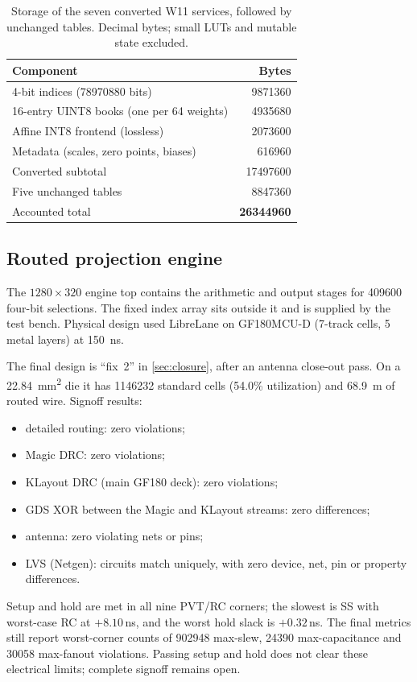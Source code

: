 \begin{table}[t]
\centering\small
\caption{Storage of the seven converted W11 services, followed by unchanged tables. Decimal bytes; small LUTs and mutable state excluded.}
\label{tab:storage}
\begin{tabular}{@{}lr@{}}
\toprule
Component & Bytes\\
\midrule
4-bit indices (\num{78970880} bits) & \num{9871360}\\
16-entry UINT8 books (one per 64 weights) & \num{4935680}\\
Affine INT8 frontend (lossless) & \num{2073600}\\
Metadata (scales, zero points, biases) & \num{616960}\\
\midrule
Converted subtotal & \num{17497600}\\
Five unchanged tables & \num{8847360}\\
\midrule
Accounted total & \textbf{\num{26344960}}\\
\bottomrule
\end{tabular}
\end{table}

\subsection{Routed projection engine}
The $1280\times320$ engine top contains the arithmetic and output stages for \num{409600} four-bit selections. The fixed index array sits outside it and is supplied by the test bench. Physical design used LibreLane on GF180MCU-D (7-track cells, 5 metal layers) at \SI{150}{ns}.

The final design is ``fix~2'' in \cref{sec:closure}, after an antenna close-out pass. On a \SI{22.84}{mm^2} die it has \num{1146232} standard cells (54.0\% utilization) and \SI{68.9}{m} of routed wire. Signoff results:
\begin{itemize}
\item detailed routing: zero violations;
\item Magic DRC: zero violations;
\item KLayout DRC (main GF180 deck): zero violations;
\item GDS XOR between the Magic and KLayout streams: zero differences;
\item antenna: zero violating nets or pins;
\item LVS (Netgen): circuits match uniquely, with zero device, net, pin or property differences.
\end{itemize}
Setup and hold are met in all nine PVT/RC corners; the slowest is SS with worst-case RC at $+8.10$\,ns, and the worst hold slack is $+0.32$\,ns. The final metrics still report worst-corner counts of \num{902948} max-slew, \num{24390} max-capacitance and \num{30058} max-fanout violations. Passing setup and hold does not clear these electrical limits; complete signoff remains open.


